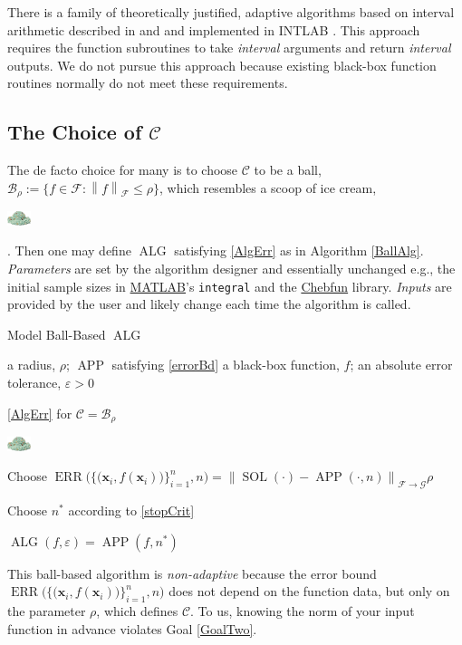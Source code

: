 \documentclass[11pt]{NSFamsart}
\newcommand{\MATLAB}{\hyperlink{MATLABlink}{MATLAB}\xspace}
\newcommand{\Chebfun}{\hyperlink{Chebfunlink}{Chebfun}\xspace}
\DeclareMathOperator{\SOL}{SOL}
\DeclareMathOperator{\APP}{APP}
\DeclareMathOperator{\ALG}{ALG}
\DeclareMathOperator{\ERR}{ERR}
\newcommand{\bx}{{\boldsymbol{x}}}
\newcommand{\cc}{\mathcal{C}}
\newcommand{\cb}{\mathcal{B}}
\newcommand{\calc}{{\mathcal{C}}}
\newcommand{\calf}{{\mathcal{F}}}
\newcommand{\calg}{{\mathcal{G}}}
\newcommand{\norm}[2][{}]{\ensuremath{\left \lVert #2 \right \rVert}_{#1}}
\newcommand{\dataN}{\bigl\{\bigl(\bx_i,f(\bx_i)\bigr)\bigr\}_{i=1}^n}
\newcommand{\ErrN}{\ERR\bigl(\dataN,n\bigr)}
\newcommand{\smallerscoop}{\parbox{0.7cm}{\includegraphics[width=0.7cm]{ProgramsImages/IceCreamScoop.eps}}\xspace}
\begin{document}
There is a family of theoretically justified, adaptive algorithms based on interval 
arithmetic described in \cite{MoKeCl09} and \cite{Rum10a} and implemented in INTLAB 
\cite{Rum99a}.  This approach requires the function subroutines to take \emph{interval} arguments 
and return \emph{interval} outputs.  We do not pursue this approach because existing black-box 
function routines normally do not meet these requirements.

\subsection{The Choice of $\calc$} \label{sec:CChoice}

The de facto choice for many is to choose $\calc$ to be a ball, $\cb_{\rho} := \{f \in \calf : \norm[\calf]{f} \le \rho \}$, which resembles a scoop of ice cream, \smallerscoop.  Then one may define $\ALG$ satisfying \eqref{AlgErr} as in Algorithm \ref{BallAlg}. \emph{Parameters} are set by the algorithm designer and essentially unchanged e.g., the initial sample sizes in \MATLAB's \texttt{integral} and the \Chebfun library.  \emph{Inputs} are provided by the user and likely change each time the algorithm is called.

\begin{algorithm}
	\caption{Model Ball-Based $\ALG$ \label{BallAlg}} 
	\begin{algorithmic}
	\PARAM a radius, $\rho$; $\APP$ satisfying \eqref{errorBd}
		\INPUT a black-box function, $f$; an absolute error tolerance,
		$\varepsilon>0$

\Ensure \eqref{AlgErr} for $\cc = \cb_{\rho}$\smallerscoop

\State Choose $\ErrN = \norm[\calf \to \calg]{\SOL(\cdot) - \APP(\cdot,n)} \rho$ 

\State Choose $n^*$ according to \eqref{stopCrit}

\RETURN $\ALG(f,\varepsilon) = \APP(f,n^*)$
\end{algorithmic}
\end{algorithm}

This ball-based algorithm is \emph{non-adaptive} because the error bound $\ErrN$ does not depend on the function data, but only on the parameter $\rho$, which defines $\calc$.  To us, knowing the norm of your input function in advance violates Goal \ref{GoalTwo}.  
\end{document}
